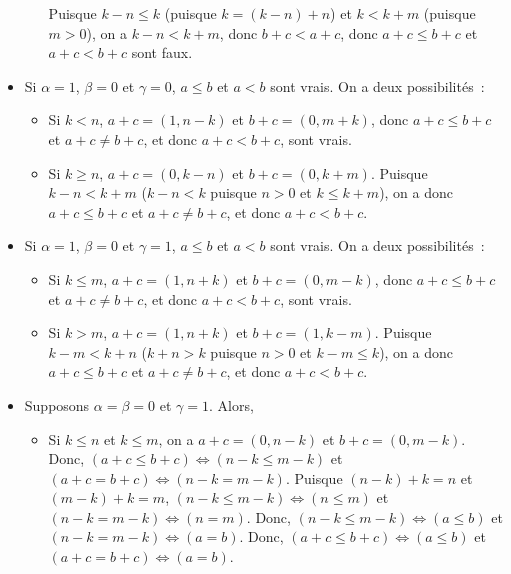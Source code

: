 \begin{itemize}[nosep]
\begin{itemize}[nosep]
                    Puisque $k-n \leq k$ (puisque $k = (k-n) + n$) et $k < k+m$ (puisque $m > 0$), on a $k-n < k+m$, donc $b+c < a+c$, donc $a+c \leq b+c$ et $a+c < b+c$ sont faux.
            \end{itemize}
        \item Si $\alpha = 1$, $\beta = 0$ et $\gamma = 0$, $a \leq b$ et $a < b$ sont vrais. 
            On a deux possibilités : 
            \begin{itemize}[nosep]
                \item Si $k < n$, $a + c = (1, n-k)$ et $b + c = (0, m+k)$, donc $a+c \leq b+c$ et $a+c \neq b+c$, et donc $a+c < b+c$, sont vrais.
                \item Si $k \geq n$, $a + c = (0, k-n)$ et $b + c = (0, k+m)$.
                    Puisque $k-n < k+m$ ($k-n < k$ puisque $n > 0$ et $k \leq k+m$), on a donc $a+c \leq b+c$ et $a+c \neq b+c$, et donc $a+c < b+c$. 
            \end{itemize}
        \item Si $\alpha = 1$, $\beta = 0$ et $\gamma = 1$, $a \leq b$ et $a < b$ sont vrais. 
            On a deux possibilités : 
            \begin{itemize}[nosep]
                \item Si $k \leq m$, $a + c = (1, n+k)$ et $b + c = (0, m-k)$, donc $a+c \leq b+c$ et $a+c \neq b+c$, et donc $a+c < b+c$, sont vrais.
                \item Si $k > m$, $a + c = (1, n+k)$ et $b + c = (1, k-m)$.
                    Puisque $k-m < k+n$ ($k+n > k$ puisque $n > 0$ et $k-m \leq k$), on a donc $a+c \leq b+c$ et $a+c \neq b+c$, et donc $a+c < b+c$. 
            \end{itemize}
        \item Supposons $\alpha = \beta = 0$ et $\gamma = 1$. 
            Alors, 
            \begin{itemize}[nosep]
                \item Si $k \leq n$ et $k \leq m$, on a $a+c = (0,n-k)$ et $b+c =(0,m-k)$.
                    Donc, $(a+c \leq b+c) \Leftrightarrow (n-k \leq m-k)$ et $(a+c = b+c) \Leftrightarrow (n-k = m-k)$.
                    Puisque $(n-k)+k = n$ et $(m-k)+k = m$, $(n-k \leq m-k) \Leftrightarrow (n \leq m)$ et $(n-k = m-k) \Leftrightarrow (n = m)$. 
                    Donc, $(n-k \leq m-k) \Leftrightarrow (a \leq b)$ et $(n-k = m-k) \Leftrightarrow (a = b)$. 
                    Donc, $(a+c \leq b+c) \Leftrightarrow (a \leq b)$ et $(a+c = b+c) \Leftrightarrow (a = b)$. 

\end{itemize}
\end{itemize}
